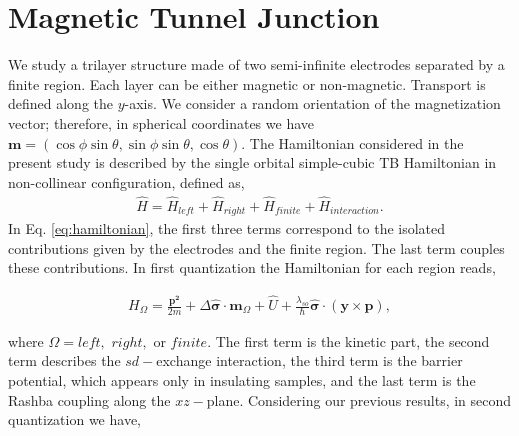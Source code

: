 \documentclass[10pt,prb,showpacs,amssymb,floatfix]{revtex4-1}
\newcommand{\Dlt}{\Delta}
\newcommand{\lam}{\lambda}
\newcommand{\Og}{\Omega}
\newcommand{\sg}{\sigma}
\newcommand{\h}{\hat}
\begin{document}
 


\section{Magnetic Tunnel Junction}

We study a trilayer structure made of two semi-infinite electrodes separated by a finite region. Each layer can be either magnetic or non-magnetic. Transport is defined along the $y$-axis. We consider a random orientation of the magnetization vector; therefore, in spherical coordinates we have $\bm m = (\cos\phi \sin\theta, \sin\phi\sin\theta, \cos\theta)$. The Hamiltonian considered in the present study is described by the single orbital simple-cubic TB Hamiltonian in non-collinear configuration, defined as,
 \begin{align}
 \h H = \h H_{left} + \h H_{right} + \h H_{finite} + \h H_{interaction}.
\label{eq:hamiltonian}
 \end{align}
In Eq. \eqref{eq:hamiltonian}, the first three terms correspond to the isolated contributions given by the electrodes and the finite region. The last term couples these contributions. In first quantization the Hamiltonian for each region reads,

\begin{align}
H_\Og = \frac{\bm{p^2}}{2m} + \Dlt \bm{\h \sg} \cdot \bm m_\Og  + \h U + \frac{\lam_{so}}{\hbar} \bm{\h \sg} \cdot (\bm y \times \bm p),
\label{1qh}
\end{align}

where $\Og = left,$ $right,$ or $finite.$ The first term is the kinetic part, the second term describes the $sd-$exchange interaction, the third term is the barrier potential, which appears only in insulating samples, and the last term is the Rashba coupling along the $xz-$plane. Considering our previous results, in second quantization we have,
\end{document}
